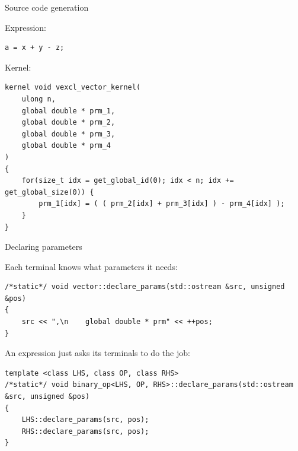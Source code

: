 \documentclass[@BEAMER_OPTIONS@]{beamer}
\begin{document}
\begin{frame}[fragile]{Source code generation}
    \begin{exampleblock}{Expression:}
        \begin{lstlisting}[numbers=none]
a = x + y - z;
        \end{lstlisting}
    \end{exampleblock}
    \begin{exampleblock}{Kernel:}
        \begin{lstlisting}
kernel void vexcl_vector_kernel(
    ulong n,
    global double * prm_1,
    global double * prm_2,
    global double * prm_3,
    global double * prm_4
)
{
    for(size_t idx = get_global_id(0); idx < n; idx += get_global_size(0)) {
        prm_1[idx] = ( ( prm_2[idx] + prm_3[idx] ) - prm_4[idx] );
    }
}
        \end{lstlisting}
    \end{exampleblock}
\end{frame}

\begin{frame}[fragile]{Declaring parameters}
    \begin{exampleblock}{Each terminal knows what parameters it needs:}
        \begin{lstlisting}
/*static*/ void vector::declare_params(std::ostream &src, unsigned &pos)
{
    src << ",\n    global double * prm" << ++pos;
}
        \end{lstlisting}
    \end{exampleblock}
    \vspace{0.5\baselineskip}
    \begin{exampleblock}{An expression just asks its terminals to do the job:}
        \begin{lstlisting}[firstnumber=last]
template <class LHS, class OP, class RHS>
/*static*/ void binary_op<LHS, OP, RHS>::declare_params(std::ostream &src, unsigned &pos)
{
    LHS::declare_params(src, pos);
    RHS::declare_params(src, pos);
}
        \end{lstlisting}
    \end{exampleblock}
\end{frame}
\end{document}
